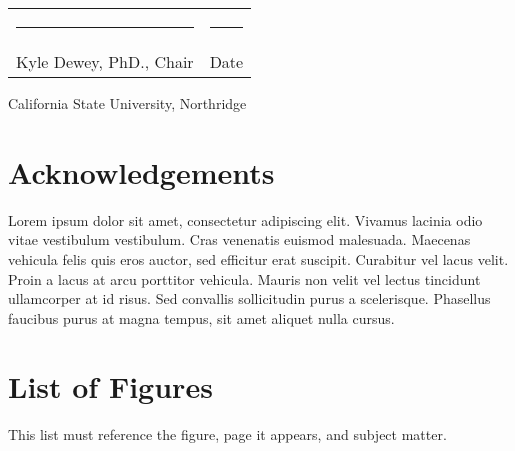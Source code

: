 \documentclass[12pt]{report} %
\begin{document}
        \begin{center}
            \begin{tabular}{p{3in} p{1in}}
                \rule{3in}{0.4pt} & \rule{1in}{0.4pt}\\
                Kyle Dewey, PhD., Chair & Date \\
            \end{tabular}
        \end{center}

        \vspace{\fill}

        \begin{center}
            California State University, Northridge
        \end{center}

    \newpage

    \chapter*{\normalfont Acknowledgements}\label{chapter:Acknowledgements}
    \vspace{3in}
        \begin{center}
            Lorem ipsum dolor sit amet, consectetur adipiscing elit.
            Vivamus lacinia odio vitae vestibulum vestibulum.
            Cras venenatis euismod malesuada.
            Maecenas vehicula felis quis eros auctor, sed efficitur erat suscipit.
            Curabitur vel lacus velit. Proin a lacus at arcu porttitor vehicula.
            Mauris non velit vel lectus tincidunt ullamcorper at id risus.
            Sed convallis sollicitudin purus a scelerisque.
            Phasellus faucibus purus at magna tempus, sit amet aliquet nulla cursus.
        \end{center}
    

    \newpage

    \tableofcontents

    \newpage


    \chapter*{\normalfont List of Figures}\label{chapter:ListFigures}
    \begin{center}
        This list must reference the figure, page it appears, and subject matter.
    \end{center}
    
\end{document}
